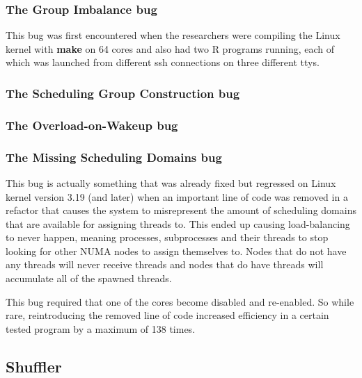 \documentclass{sig-alternate}
\begin{document}
\subsubsection{The Group Imbalance bug}
\label{sec:cfsfault_grpimbalance}

This bug was first encountered when the researchers were compiling the Linux kernel with \textbf{make} on 64 cores and also had two R programs running, each of which was launched from different ssh connections on three different ttys. ~\cite{Lozi:2016}

\subsubsection{The Scheduling Group Construction bug}
\label{sec:cfsfault_grpconstruct}


\subsubsection{The Overload-on-Wakeup bug}
\label{sec:cfsfault_overload}


\subsubsection{The Missing Scheduling Domains bug}
\label{sec:cfsfault_missingsched}

This bug is actually something that was already fixed but regressed on Linux kernel version 3.19 (and later) when an important line of code was removed in a refactor that causes the system to misrepresent the amount of scheduling domains that are available for assigning threads to. This ended up causing load-balancing to never happen, meaning processes, subprocesses and their threads to stop looking for other NUMA nodes to assign themselves to. Nodes that do not have any threads will never receive threads and nodes that do have threads will accumulate all of the spawned threads.

This bug required that one of the cores become disabled and re-enabled. So while rare, reintroducing the removed line of code increased efficiency in a certain tested program by a maximum of 138 times.~\cite{Lozi:2016}


\subsection{Shuffler}
\label{sec:shuffler}
\end{document}
